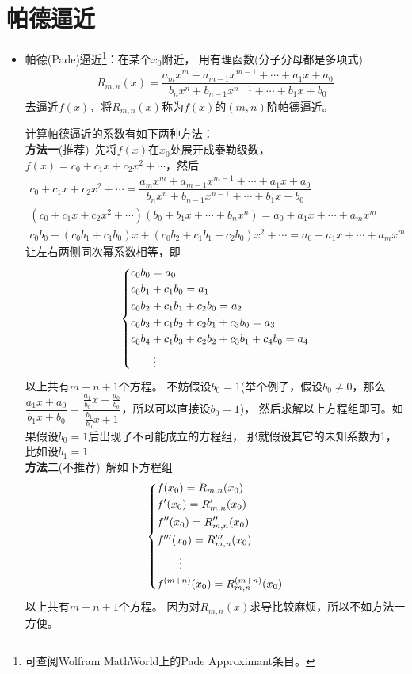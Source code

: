 \section{帕德逼近}
\begin{itemize}[leftmargin=\inteval{\myitemleftmargin}pt,itemsep=
   \inteval{\myitemitempsep}pt,topsep=\inteval{\myitemtopsep}pt]
\item 帕德(Pade)逼近\footnote{可查阅Wolfram 
MathWorld上的Pade Approximant条目。}：在某个$ x_0 $附近，
用有理函数(分子分母都是多项式)
\begin{gather*}
    R_{m,n}(x)=\dfrac{a_mx^m+a_{m-1}x^{m-1}+\cdots+a_1x+a_0}
    {b_nx^n+b_{n-1}x^{n-1}+\cdots+b_1x+b_0}
\end{gather*}
去逼近$ f(x) $，将$ R_{m,n}(x) $称为$ f(x) $的$ (m,n) $阶帕德逼近。

计算帕德逼近的系数有如下两种方法：\\
\textbf{方法一}(推荐)\ 先将$ f(x) $在$ x_0 $处展开成泰勒级数，
$ f(x)=c_0+c_1x+c_2x^2+\cdots $，然后
\begin{gather*}
    c_0+c_1x+c_2x^2+\cdots=
    \dfrac{a_mx^m+a_{m-1}x^{m-1}+\cdots+a_1x+a_0}
    {b_nx^n+b_{n-1}x^{n-1}+\cdots+b_1x+b_0} \\
    (c_0+c_1x+c_2x^2+\cdots)(b_0+b_1x+\cdots+b_nx^n)=
    a_0+a_1x+\cdots+a_mx^m \\
    c_0b_0+(c_0b_1+c_1b_0)x+(c_0b_2+c_1b_1+c_2b_0)x^2+\cdots
    =a_0+a_1x+\cdots+a_mx^m
\end{gather*}
让左右两侧同次幂系数相等，即
\begin{align*}
    \begin{dcases}
        c_0b_0=a_0 \\
        c_0b_1+c_1b_0=a_1 \\
        c_0b_2+c_1b_1+c_2b_0=a_2 \\
        c_0b_3+c_1b_2+c_2b_1+c_3b_0=a_3 \\
        c_0b_4+c_1b_3+c_2b_2+c_3b_1+c_4b_0=a_4 \\
        \quad\quad \vdots
    \end{dcases}
\end{align*}
以上共有$ m+n+1 $个方程。
不妨假设$ b_0=1 $(举个例子，假设$ b_0\neq 0 $，那么
$ \dfrac{a_1x+a_0}{b_1x+b_0}=\dfrac{\frac{a_1}{b_0}x+
    \frac{a_0}{b_0}}{\frac{b_1}{b_0}x+1} $，所以可以直接设$ b_0=1 $)，
然后求解以上方程组即可。如果假设$ b_0=1 $后出现了不可能成立的方程组，
那就假设其它的未知系数为1，比如设$ b_1=1 $. \\
\textbf{方法二}(不推荐)\ 解如下方程组
\begin{align*}
    \begin{dcases}
        f(x_0)=R_{m,n}(x_0) \\
        f'(x_0)=R_{m,n}'(x_0) \\
        f''(x_0)=R_{m,n}''(x_0) \\
        f'''(x_0)=R_{m,n}'''(x_0) \\
        \quad\quad\vdots \\
        f^{(m+n)}(x_0)=R_{m,n}^{(m+n)}(x_0)
    \end{dcases}
\end{align*}
以上共有$ m+n+1 $个方程。
因为对$ R_{m,n}(x) $求导比较麻烦，所以不如方法一方便。


\end{itemize}
